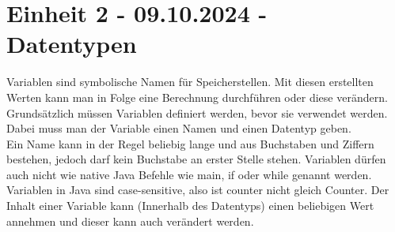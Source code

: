 \documentclass{article}
\begin{document}
	\section{Einheit 2 - 09.10.2024 - Datentypen}
	Variablen sind symbolische Namen für Speicherstellen. Mit diesen erstellten Werten kann man in Folge eine Berechnung durchführen oder diese verändern. \\
	Grundsätzlich müssen Variablen definiert werden, bevor sie verwendet werden. Dabei muss man der Variable einen Namen und einen Datentyp geben. \\
	Ein Name kann in der Regel beliebig lange und aus Buchstaben und Ziffern bestehen, jedoch darf kein Buchstabe an erster Stelle stehen. Variablen dürfen auch nicht wie native Java Befehle wie main, if oder while genannt werden. Variablen in Java sind case-sensitive, also ist counter nicht gleich Counter. Der Inhalt einer Variable kann (Innerhalb des Datentyps) einen beliebigen Wert annehmen und dieser kann auch verändert werden. \\
\end{document}
